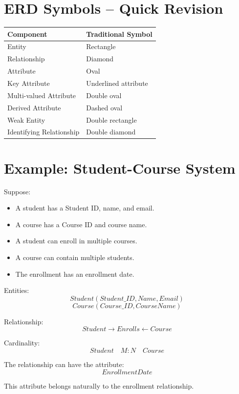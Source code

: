 \documentclass[12pt,a4paper]{article}
\begin{document}
\section{ERD Symbols -- Quick Revision}

\begin{center}
\begin{tabular}{p{} p{}}
\toprule
\textbf{Component} & \textbf{Traditional Symbol}\\
\midrule
Entity & Rectangle\\
Relationship & Diamond\\
Attribute & Oval\\
Key Attribute & Underlined attribute\\
Multi-valued Attribute & Double oval\\
Derived Attribute & Dashed oval\\
Weak Entity & Double rectangle\\
Identifying Relationship & Double diamond\\
\bottomrule
\end{tabular}
\end{center}

\section{Example: Student-Course System}

Suppose:
\begin{itemize}
\item A student has a Student ID, name, and email.
\item A course has a Course ID and course name.
\item A student can enroll in multiple courses.
\item A course can contain multiple students.
\item The enrollment has an enrollment date.
\end{itemize}

Entities:
\[
Student(Student\_ID, Name, Email)
\]
\[
Course(Course\_ID, CourseName)
\]

Relationship:
\[
Student \longrightarrow Enrolls \longleftarrow Course
\]

Cardinality:
\[
Student \quad M:N \quad Course
\]

The relationship can have the attribute:
\[
EnrollmentDate
\]

This attribute belongs naturally to the enrollment relationship.
\end{document}
